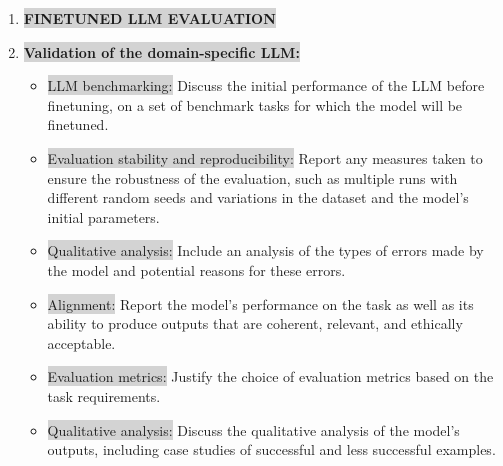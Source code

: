 \documentclass{article}
\begin{document}
\begin{enumerate}
\item \colorbox{lightgray}{\textbf{FINETUNED LLM EVALUATION}}
    \item[\colorbox{lightgray}{18}] \colorbox{lightgray}{\textbf{Validation of the domain-specific LLM:}}

\begin{itemize}
\item[\colorbox{lightgray}{18a.}] \colorbox{lightgray}{LLM benchmarking:} Discuss the initial performance of the LLM before finetuning, on a set of benchmark tasks for which the model will be finetuned.
\item[\colorbox{lightgray}{18b.}] \colorbox{lightgray}{Evaluation stability and reproducibility:} Report any measures taken to ensure the robustness of the evaluation, such as multiple runs with different random seeds and variations in the dataset and the model's initial parameters.
\item[\colorbox{lightgray}{18c.}] \colorbox{lightgray}{Qualitative analysis:} Include an analysis of the types of errors made by the model and potential reasons for these errors.
\item[\colorbox{lightgray}{18d.}] \colorbox{lightgray}{Alignment:} Report the model's performance on the task as well as its ability to produce outputs that are coherent, relevant, and ethically acceptable.
\item[\colorbox{lightgray}{18e.}] \colorbox{lightgray}{Evaluation metrics:} Justify the choice of evaluation metrics based on the task requirements.
\item[\colorbox{lightgray}{18f.}] \colorbox{lightgray}{Qualitative analysis:} Discuss the qualitative analysis of the model's outputs, including case studies of successful and less successful examples.
\end{itemize}



\end{enumerate}
\end{document}

